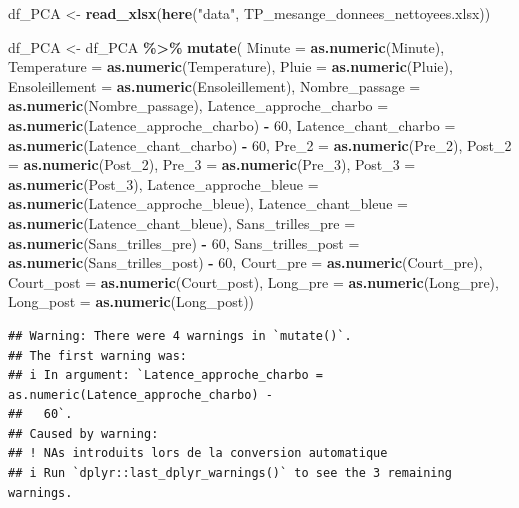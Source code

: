\documentclass[
  french,
]{article}
\newenvironment{Shaded}{\begin{snugshade}}{\end{snugshade}}
\newcommand{\AttributeTok}[1]{\textcolor[rgb]{0.13,0.29,0.53}{#1}}
\newcommand{\DecValTok}[1]{\textcolor[rgb]{0.00,0.00,0.81}{#1}}
\newcommand{\FunctionTok}[1]{\textcolor[rgb]{0.13,0.29,0.53}{\textbf{#1}}}
\newcommand{\NormalTok}[1]{#1}
\newcommand{\OtherTok}[1]{\textcolor[rgb]{0.56,0.35,0.01}{#1}}
\newcommand{\SpecialCharTok}[1]{\textcolor[rgb]{0.81,0.36,0.00}{\textbf{#1}}}
\newcommand{\StringTok}[1]{\textcolor[rgb]{0.31,0.60,0.02}{#1}}
\begin{document}
\begin{Shaded}
\begin{Highlighting}[]
\NormalTok{df\_PCA }\OtherTok{\textless{}{-}} \FunctionTok{read\_xlsx}\NormalTok{(}\FunctionTok{here}\NormalTok{(}\StringTok{"data"}\NormalTok{, }\StringTok{\textquotesingle{}TP\_mesange\_donnees\_nettoyees.xlsx\textquotesingle{}}\NormalTok{))}

\NormalTok{df\_PCA }\OtherTok{\textless{}{-}}\NormalTok{ df\_PCA }\SpecialCharTok{\%\textgreater{}\%} \FunctionTok{mutate}\NormalTok{(}
  \AttributeTok{Minute =} \FunctionTok{as.numeric}\NormalTok{(Minute), }
  \AttributeTok{Temperature =} \FunctionTok{as.numeric}\NormalTok{(Temperature), }
  \AttributeTok{Pluie =} \FunctionTok{as.numeric}\NormalTok{(Pluie), }
  \AttributeTok{Ensoleillement =} \FunctionTok{as.numeric}\NormalTok{(Ensoleillement), }
  \AttributeTok{Nombre\_passage =} \FunctionTok{as.numeric}\NormalTok{(Nombre\_passage), }
  \AttributeTok{Latence\_approche\_charbo =} \FunctionTok{as.numeric}\NormalTok{(Latence\_approche\_charbo) }\SpecialCharTok{{-}} \DecValTok{60}\NormalTok{, }
  \AttributeTok{Latence\_chant\_charbo =} \FunctionTok{as.numeric}\NormalTok{(Latence\_chant\_charbo) }\SpecialCharTok{{-}} \DecValTok{60}\NormalTok{, }
  \AttributeTok{Pre\_2 =} \FunctionTok{as.numeric}\NormalTok{(Pre\_2), }
  \AttributeTok{Post\_2 =} \FunctionTok{as.numeric}\NormalTok{(Post\_2), }
  \AttributeTok{Pre\_3 =} \FunctionTok{as.numeric}\NormalTok{(Pre\_3), }
  \AttributeTok{Post\_3 =} \FunctionTok{as.numeric}\NormalTok{(Post\_3), }
  \AttributeTok{Latence\_approche\_bleue =} \FunctionTok{as.numeric}\NormalTok{(Latence\_approche\_bleue), }
  \AttributeTok{Latence\_chant\_bleue =} \FunctionTok{as.numeric}\NormalTok{(Latence\_chant\_bleue),}
  \AttributeTok{Sans\_trilles\_pre =} \FunctionTok{as.numeric}\NormalTok{(Sans\_trilles\_pre) }\SpecialCharTok{{-}} \DecValTok{60}\NormalTok{, }
  \AttributeTok{Sans\_trilles\_post =} \FunctionTok{as.numeric}\NormalTok{(Sans\_trilles\_post) }\SpecialCharTok{{-}} \DecValTok{60}\NormalTok{, }
  \AttributeTok{Court\_pre =} \FunctionTok{as.numeric}\NormalTok{(Court\_pre), }
  \AttributeTok{Court\_post =} \FunctionTok{as.numeric}\NormalTok{(Court\_post), }
  \AttributeTok{Long\_pre =} \FunctionTok{as.numeric}\NormalTok{(Long\_pre), }
  \AttributeTok{Long\_post =} \FunctionTok{as.numeric}\NormalTok{(Long\_post))}
\end{Highlighting}
\end{Shaded}

\begin{verbatim}
## Warning: There were 4 warnings in `mutate()`.
## The first warning was:
## i In argument: `Latence_approche_charbo = as.numeric(Latence_approche_charbo) -
##   60`.
## Caused by warning:
## ! NAs introduits lors de la conversion automatique
## i Run `dplyr::last_dplyr_warnings()` to see the 3 remaining warnings.
\end{verbatim}
\end{document}
